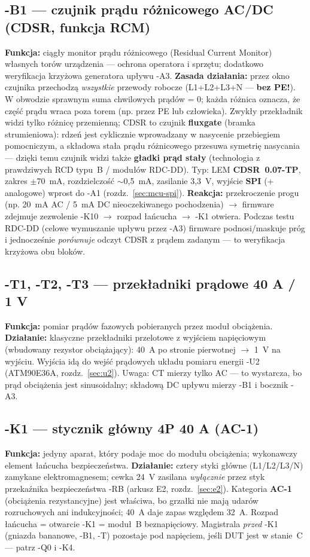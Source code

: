 \documentclass[11pt,a4paper]{article}
\begin{document}
\subsection{-B1 --- czujnik prądu różnicowego AC/DC (CDSR, funkcja RCM)}
\label{sec:b1}
\textbf{Funkcja:} ciągły monitor prądu różnicowego (Residual Current Monitor) własnych torów
urządzenia --- ochrona operatora i sprzętu; dodatkowo weryfikacja krzyżowa generatora upływu -A3.
\textbf{Zasada działania:} przez okno czujnika przechodzą \emph{wszystkie} przewody robocze
(L1+L2+L3+N --- \textbf{bez PE!}). W obwodzie sprawnym suma chwilowych prądów = 0; każda różnica
oznacza, że część prądu wraca poza torem (np. przez PE lub człowieka). Zwykły przekładnik widzi
tylko różnicę przemienną; CDSR to czujnik \textbf{fluxgate} (bramka strumieniowa): rdzeń jest
cyklicznie wprowadzany w nasycenie przebiegiem pomocniczym, a składowa stała prądu różnicowego
przesuwa symetrię nasycania --- dzięki temu czujnik widzi także \textbf{gładki prąd stały}
(technologia z prawdziwych RCD typu~B / modułów RDC-DD). Typ: LEM \textbf{CDSR~0.07-TP},
zakres $\pm$70~mA, rozdzielczość $\sim$0,5~mA, zasilanie 3,3~V, wyjście \textbf{SPI} (+ analogowe)
wprost do -A1 (rozdz.~\ref{sec:mcu-spi}).
\textbf{Reakcja:} przekroczenie progu (np. 20~mA AC / 5~mA DC nieoczekiwanego pochodzenia)
$\to$ firmware zdejmuje zezwolenie -K10 $\to$ rozpad łańcucha $\to$ -K1 otwiera. Podczas testu
RDC-DD (celowe wymuszanie upływu przez -A3) firmware podnosi/maskuje próg i jednocześnie
\emph{porównuje} odczyt CDSR z prądem zadanym --- to weryfikacja krzyżowa obu bloków.

\subsection{-T1, -T2, -T3 --- przekładniki prądowe 40 A / 1 V}
\textbf{Funkcja:} pomiar prądów fazowych pobieranych przez moduł obciążenia.
\textbf{Działanie:} klasyczne przekładniki przelotowe z wyjściem napięciowym (wbudowany rezystor
obciążający): 40~A po stronie pierwotnej $\to$ 1~V na wyjściu. Wyjścia idą do wejść prądowych
układu pomiaru energii -U2 (ATM90E36A, rozdz.~\ref{sec:u2}). Uwaga: CT mierzy tylko AC --- to
wystarcza, bo prąd obciążenia jest sinusoidalny; składową DC upływu mierzy -B1 i bocznik -A3.

\subsection{-K1 --- stycznik główny 4P 40 A (AC-1)}
\textbf{Funkcja:} jedyny aparat, który podaje moc do modułu obciążenia; wykonawczy element
łańcucha bezpieczeństwa. \textbf{Działanie:} cztery styki główne (L1/L2/L3/N) zamykane
elektromagnesem; cewka 24~V zasilana \emph{wyłącznie} przez styk przekaźnika bezpieczeństwa -RB
(arkusz E2, rozdz.~\ref{sec:e2}). Kategoria \textbf{AC-1} (obciążenia rezystancyjne) jest właściwa,
bo grzałki nie mają udarów rozruchowych ani indukcyjności; 40~A daje zapas względem 32~A.
Rozpad łańcucha = otwarcie -K1 = moduł~B beznapięciowy. Magistrala \emph{przed} -K1 (gniazda
bananowe, -B1, -T) pozostaje pod napięciem, jeśli DUT jest w stanie~C --- patrz -Q0 i -K4.
\end{document}
